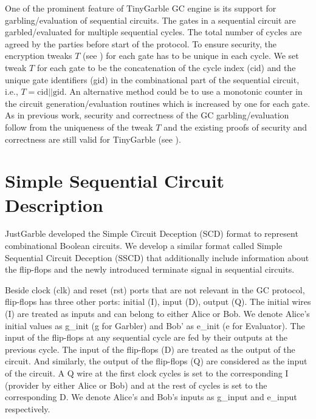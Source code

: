 One of the prominent feature of TinyGarble GC engine is its support for garbling/evaluation of sequential circuits.
The gates in a sequential circuit are garbled/evaluated for multiple sequential cycles.
The total number of cycles are agreed by the parties before start of the protocol.
To ensure security, the encryption tweaks $T$ (see ) for each gate has to be unique in each cycle\cite[Sect. 3.4]{henecka2013faster}.
We set tweak $T$ for each gate to be the concatenation of the cycle index (cid) and the unique gate identifiers (gid) in the combinational part of the sequential circuit, i.e., $T = \textrm{cid} || \textrm{gid}$.
An alternative method could be to use a monotonic counter in the circuit generation/evaluation routines which is increased by one for each gate.
As in previous work, security and correctness of the GC garbling/evaluation follow from the uniqueness of the tweak $T$ and the existing proofs of security and correctness are still valid for TinyGarble (see \cite{lindell2009proof, bellare2013efficient, zahur2015two}).


\section{Simple Sequential Circuit Description}\label{ssec:engine-sscd}
JustGarble \cite{bellare2013efficient} developed the Simple Circuit Deception (SCD) format to represent combinational Boolean circuits.
We develop a similar format called Simple Sequential Circuit Deception (SSCD) that additionally include information about the flip-flops and the newly introduced terminate signal in sequential circuits.

Beside clock (clk) and reset (rst) ports that are not relevant in the GC protocol, flip-flops has three other ports: initial (I), input (D), output (Q).
The initial wires (I) are treated as inputs and can belong to either Alice or Bob.
We denote Alice's initial values as g\_init (g for Garbler) and Bob' as e\_init (e for Evaluator).
The input of the flip-flops at any sequential cycle are fed by their outputs at the previous cycle.
The input of the flip-flops (D) are treated  as the output of the circuit.
And similarly, the output of the flip-flops (Q) are considered as the input of the circuit.  
A Q wire at the first clock cycles is set to the corresponding I (provider by either Alice or Bob) and at the rest of cycles is set to the corresponding D.
We denote Alice's and Bob's inputs as g\_input and e\_input respectively.

